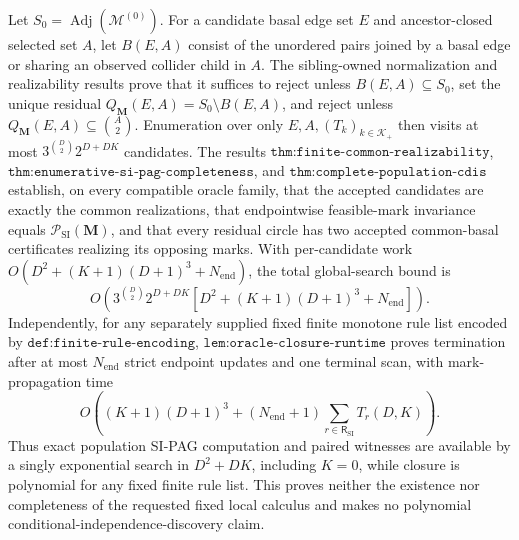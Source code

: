 Let \(S_0=\operatorname{Adj}(\mathcal M^{(0)})\).  For a candidate basal edge set \(E\) and ancestor-closed selected set \(A\), let \(B(E,A)\) consist of the unordered pairs joined by a basal edge or sharing an observed collider child in \(A\).  The sibling-owned normalization and realizability results prove that it suffices to reject unless \(B(E,A)\subseteq S_0\), set the unique residual \(Q_{\mathbf M}(E,A)=S_0\setminus B(E,A)\), and reject unless \(Q_{\mathbf M}(E,A)\subseteq\binom A2\).  Enumeration over only \(E,A,(T_k)_{k\in\mathcal K_+}\) then visits at most \(3^{\binom D2}2^{D+DK}\) candidates.  The results \(\texttt{thm:finite-common-realizability}\), \(\texttt{thm:enumerative-si-pag-completeness}\), and \(\texttt{thm:complete-population-cdis}\) establish, on every compatible oracle family, that the accepted candidates are exactly the common realizations, that endpointwise feasible-mark invariance equals \(\mathcal P_{\mathrm{SI}}(\mathbf M)\), and that every residual circle has two accepted common-basal certificates realizing its opposing marks.  With per-candidate work \(O(D^2+(K+1)(D+1)^3+N_{\mathrm{end}})\), the total global-search bound is \[O\!\left(3^{\binom D2}2^{D+DK}\left[D^2+(K+1)(D+1)^3+N_{\mathrm{end}}\right]\right).\] Independently, for any separately supplied fixed finite monotone rule list encoded by \(\texttt{def:finite-rule-encoding}\), \(\texttt{lem:oracle-closure-runtime}\) proves termination after at most \(N_{\mathrm{end}}\) strict endpoint updates and one terminal scan, with mark-propagation time \[O\!\left((K+1)(D+1)^3+(N_{\mathrm{end}}+1)\sum_{r\in\mathsf R_{\mathrm{SI}}}T_r(D,K)\right).\] Thus exact population SI-PAG computation and paired witnesses are available by a singly exponential search in \(D^2+DK\), including \(K=0\), while closure is polynomial for any fixed finite rule list.  This proves neither the existence nor completeness of the requested fixed local calculus and makes no polynomial conditional-independence-discovery claim.